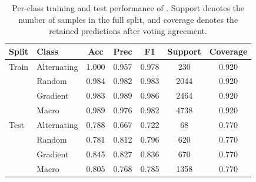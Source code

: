 \begin{table}[h!]
\centering
\caption{Per-class training and test performance of \sysname{}. Support denotes the number of samples in the full split, and coverage denotes the retained predictions after voting agreement.}
\begin{tabular}{llccccc}
\toprule
\textbf{Split} & \textbf{Class} & \textbf{Acc} & \textbf{Prec} & \textbf{F1} & \textbf{Support} & \textbf{Coverage} \\
\midrule
Train & Alternating & 1.000 & 0.957 & 0.978 & 230 & 0.920 \\
 & Random & 0.984 & 0.982 & 0.983 & 2044 & 0.920 \\
 & Gradient & 0.983 & 0.989 & 0.986 & 2464 & 0.920 \\
 & Macro & 0.989 & 0.976 & 0.982 & 4738 & 0.920 \\
\midrule
Test & Alternating & 0.788 & 0.667 & 0.722 & 68 & 0.770 \\
 & Random & 0.781 & 0.812 & 0.796 & 620 & 0.770 \\
 & Gradient & 0.845 & 0.827 & 0.836 & 670 & 0.770 \\
 & Macro & 0.805 & 0.768 & 0.785 & 1358 & 0.770 \\
\midrule
\bottomrule
\end{tabular}
\label{tab:train_test_voting_performance}
\end{table}
